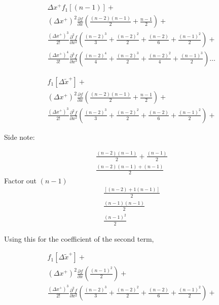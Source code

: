 \documentclass[12pt]{article}
\begin{document}
\begin{align*}
    \Delta x^+ f_1\left[ (n - 1)  \right] + \\
    (\Delta x^+)^2 \frac{\partial f}{\partial x } \left(
    \frac{(n-2)\left( n-1 \right)}{2} + \frac{n-1}{2} \right) + \\
        \frac{(\Delta x^+)^3}{2!} \frac{\partial^2 f}{\partial x^2 } \left(
        \frac{(n-2)^3}{3} + \frac{(n-2)^2}{2} + \frac{(n-2)}{6} + \frac{(n-1)^2}{2} \right)  + \\
    \frac{(\Delta x^+)^4}{3!} \frac{\partial^3 f}{\partial x^3 } \left(
    \frac{(n-2)^4}{4} + \frac{(n-2)^3}{2} + \frac{(n-2)^2}{4} + \frac{(n-1)^3}{2} \right) \dots
\end{align*}

\begin{align*}
     f_1\left[ \Delta \widetilde{x}^+  \right] + \\
    (\Delta x^+)^2 \frac{\partial f}{\partial x } \left(
    \frac{(n-2)\left( n-1 \right)}{2} + \frac{n-1}{2} \right) + \\
        \frac{(\Delta x^+)^3}{2!} \frac{\partial^2 f}{\partial x^2 } \left(
        \frac{(n-2)^3}{3} + \frac{(n-2)^2}{2} + \frac{(n-2)}{6} + \frac{(n-1)^2}{2} \right)  + 
\end{align*}

Side note: 

\begin{align*}
    \frac{(n - 2)(n-1)}{2} + \frac{(n-1)}{2}\\
    \frac{(n - 2)(n-1) + (n-1)}{2} 
\end{align*}
Factor out $(n-1)$
\begin{align*}
    \frac{\left[ \left( n - 2 \right) + 1 \left( n - 1 \right) \right]}{2} \\
    \frac{\left( n-1 \right)\left( n - 1 \right)}{2} \\
    \frac{\left( n - 1 \right)^2}{2}
\end{align*}

Using this for the coefficient of the second term,

\begin{align*}
     f_1\left[ \Delta \widetilde{x}^+  \right] + \\
    (\Delta x^+)^2 \frac{\partial f}{\partial x } \left(
    \frac{(n-1)^2}{2}  \right) + \\
        \frac{(\Delta x^+)^3}{2!} \frac{\partial^2 f}{\partial x^2 } \left(
        \frac{(n-2)^3}{3} + \frac{(n-2)^2}{2} + \frac{(n-2)}{6} + \frac{(n-1)^2}{2} \right)  +
\end{align*}
\end{document}
